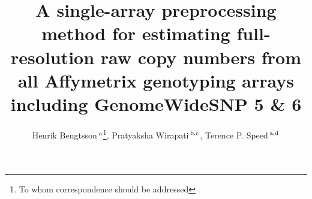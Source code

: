 \documentclass{bioinfo}
\begin{document}

\title[CRMA~v2]{A single-array preprocessing method for estimating full-resolution raw copy numbers from all Affymetrix genotyping arrays including GenomeWideSNP 5 \& 6}
\author[Bengtsson \& Speed]{Henrik Bengtsson\,$^{\rm a}$\footnote{To whom correspondence should be addressed}, Pratyaksha Wirapati\,$^{\rm b,c}$, Terence P. Speed\,$^{\rm a,d}$}
\address{
  $^{\rm a}$ Department of Statistics, University of California, Berkeley, USA.
  $^{\rm b}$ National Center of Competence in Research Molecular Oncology, Swiss Institute of Experimental Cancer Research, Epalinges, Switzerland.
  $^{\rm c}$ Bioinformatics Core Facility, Swiss Institute of Bioinformatics, Lausanne, Switzerland.
  $^{\rm d}$ Bioinformatics Division, Walter \& Eliza Hall Institute of Medical Research, Parkville, Australia.
} 



\maketitle
\end{document}
